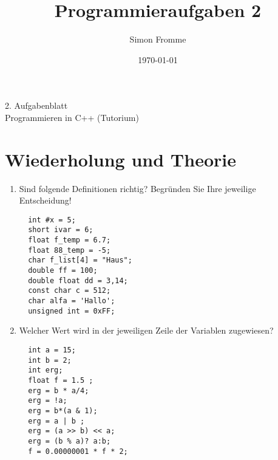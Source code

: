 \documentclass[paper=a4, fontsize=11pt, twoside]{scrartcl}
\title{Programmieraufgaben 2}
\author{Simon Fromme}
\date{\normalsize\today}
\begin{document}
\vspace*{0.75\baselineskip}
\begin{center}
  \Large 2. Aufgabenblatt \\\vspace{0.5em} \large Programmieren in C++ (Tutorium)
\end{center}

\section*{Wiederholung und Theorie}
\begin{multicols}{2}
\begin{enumerate}
 \item Sind folgende Definitionen richtig? Begründen Sie Ihre jeweilige Entscheidung!
  \begin{verbatim}
  int #x = 5;
  short ivar = 6;
  float f_temp = 6.7;
  float 88_temp = -5;
  char f_list[4] = "Haus";
  double ff = 100;
  double float dd = 3,14;
  const char c = 512;
  char alfa = 'Hallo';
  unsigned int = 0xFF;
  \end{verbatim}
  \columnbreak
 \item Welcher Wert wird in der jeweiligen Zeile der Variablen zugewiesen?
  \begin{verbatim}
  int a = 15;
  int b = 2;
  int erg;
  float f = 1.5 ;
  erg = b * a/4;
  erg = !a;
  erg = b*(a & 1);
  erg = a | b ;
  erg = (a >> b) << a;
  erg = (b % a)? a:b;
  f = 0.00000001 * f * 2;
  \end{verbatim}
\end{enumerate}
\end{multicols}
\end{document}
